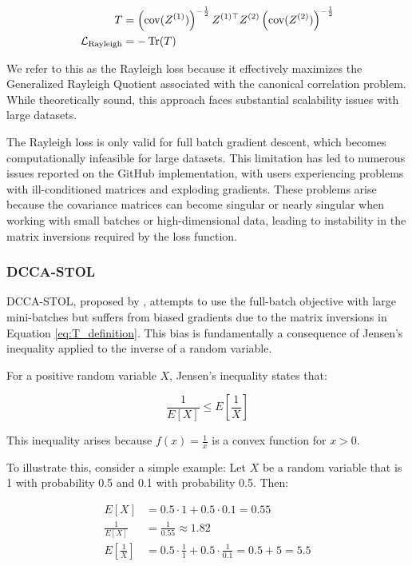 \begin{align}\label{eq:T_definition}
    T          & = \left(\text{cov}(Z^{(1)})\right)^{-\frac{1}{2}} Z^{(1)\top} Z^{(2)} \left(\text{cov}(Z^{(2)})\right)^{-\frac{1}{2}} \\
    \mathcal{L}_\text{Rayleigh} & = -\operatorname{Tr}(T)
\end{align}

We refer to this as the Rayleigh loss because it effectively maximizes the Generalized Rayleigh Quotient associated with the canonical correlation problem. While theoretically sound, this approach faces substantial scalability issues with large datasets.

The Rayleigh loss is only valid for full batch gradient descent, which becomes computationally infeasible for large datasets. This limitation has led to numerous issues reported on the GitHub implementation, with users experiencing problems with ill-conditioned matrices and exploding gradients. These problems arise because the covariance matrices can become singular or nearly singular when working with small batches or high-dimensional data, leading to instability in the matrix inversions required by the loss function.

\subsubsection{DCCA-STOL}
DCCA-STOL, proposed by \citet{wang2015unsupervised}, attempts to use the full-batch objective with large mini-batches but suffers from biased gradients due to the matrix inversions in Equation \eqref{eq:T_definition}. This bias is fundamentally a consequence of Jensen's inequality applied to the inverse of a random variable. 

For a positive random variable $X$, Jensen's inequality states that:

\begin{equation}
\frac{1}{E[X]} \leq E[\frac{1}{X}]
\end{equation}

This inequality arises because $f(x) = \frac{1}{x}$ is a convex function for $x > 0$. 

To illustrate this, consider a simple example: Let $X$ be a random variable that is 1 with probability 0.5 and 0.1 with probability 0.5. Then:

\begin{align}
    E[X] &= 0.5 \cdot 1 + 0.5 \cdot 0.1 = 0.55 \\
    \frac{1}{E[X]} &= \frac{1}{0.55} \approx 1.82 \\
    E[\frac{1}{X}] &= 0.5 \cdot \frac{1}{1} + 0.5 \cdot \frac{1}{0.1} = 0.5 + 5 = 5.5
\end{align}


